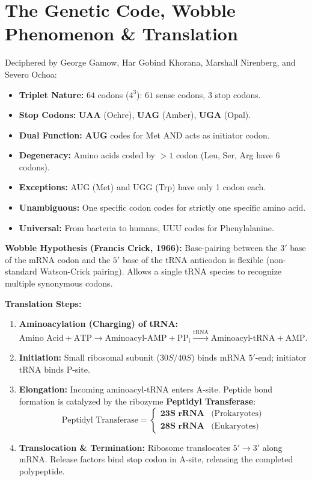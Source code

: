 \documentclass[10pt,twoside,openright]{book}
\begin{document}
\section{The Genetic Code, Wobble Phenomenon \& Translation}

\begin{formulabox}
Deciphered by George Gamow, Har Gobind Khorana, Marshall Nirenberg, and Severo Ochoa:
\begin{itemize}[leftmargin=*]
  \item \textbf{Triplet Nature:} $64$ codons ($4^3$): $61$ sense codons, $3$ stop codons.
  \item \textbf{Stop Codons:} $\mathbf{UAA}$ (Ochre), $\mathbf{UAG}$ (Amber), $\mathbf{UGA}$ (Opal).
  \item \textbf{Dual Function:} $\mathbf{AUG}$ codes for Met AND acts as initiator codon.
  \item \textbf{Degeneracy:} Amino acids coded by $>1$ codon (Leu, Ser, Arg have 6 codons).
  \item \textbf{Exceptions:} AUG (Met) and UGG (Trp) have only 1 codon each.
  \item \textbf{Unambiguous:} One specific codon codes for strictly one specific amino acid.
  \item \textbf{Universal:} From bacteria to humans, UUU codes for Phenylalanine.
\end{itemize}

\textbf{Wobble Hypothesis (Francis Crick, 1966):}
Base-pairing between the $3'$ base of the mRNA codon and the $5'$ base of the tRNA anticodon is flexible (non-standard Watson-Crick pairing). Allows a single tRNA species to recognize multiple synonymous codons.

\textbf{Translation Steps:}
\begin{enumerate}
  \item \textbf{Aminoacylation (Charging) of tRNA:} $\text{Amino Acid} + \text{ATP} \to \text{Aminoacyl-AMP} + \mathrm{PP_i} \xrightarrow{\text{tRNA}} \text{Aminoacyl-tRNA} + \text{AMP}$.
  \item \textbf{Initiation:} Small ribosomal subunit ($30S/40S$) binds mRNA $5'$-end; initiator tRNA binds P-site.
  \item \textbf{Elongation:} Incoming aminoacyl-tRNA enters A-site. Peptide bond formation is catalyzed by the ribozyme \textbf{Peptidyl Transferase}:
  \begin{equation*}
    \text{Peptidyl Transferase} = 
    \begin{cases}
      \mathbf{23S\text{ rRNA}} & \text{(Prokaryotes)} \\
      \mathbf{28S\text{ rRNA}} & \text{(Eukaryotes)}
    \end{cases}
  \end{equation*}
  \item \textbf{Translocation \& Termination:} Ribosome translocates $5'\to 3'$ along mRNA. Release factors bind stop codon in A-site, releasing the completed polypeptide.
\end{enumerate}
\end{formulabox}
\end{document}
